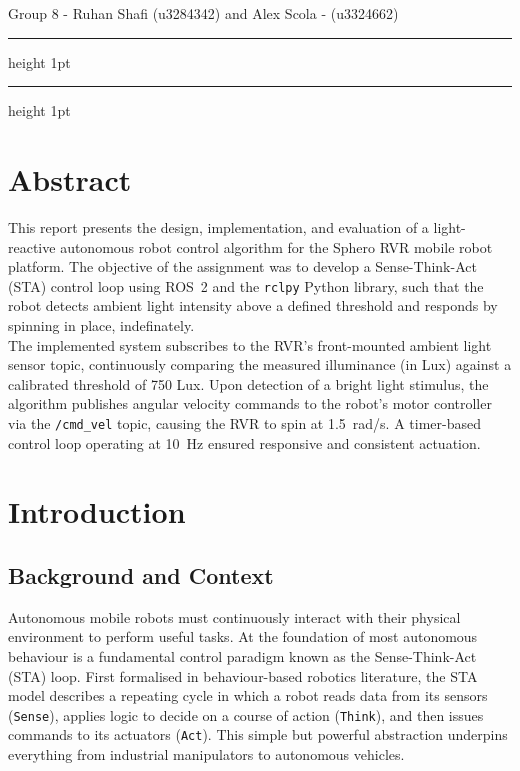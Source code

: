 \documentclass[11 pt , a 4 paper ]{article}
\theoremstyle{definition}
\begin{document}
	\vskip 7pt
	 Group 8 - Ruhan Shafi (u3284342) and Alex Scola - (u3324662)
	{\color{aqua}\hrule height 1pt}
	{\color{grey}\hrule height 1pt}
	
	\vskip 5pt


 

	\section{Abstract}
	
	This report presents the design, implementation, and evaluation of a light-reactive autonomous robot control algorithm for the Sphero RVR mobile robot platform. The objective of the assignment was to develop a Sense-Think-Act (STA) control loop using ROS~2 and the \texttt{rclpy} Python library, such that the robot detects ambient light intensity above a defined threshold and responds by spinning in place, indefinately.\\

	\noindent The implemented system subscribes to the RVR's front-mounted ambient light sensor topic, continuously comparing the measured illuminance (in Lux) against a calibrated threshold of 750 Lux. Upon detection of a bright light stimulus, the algorithm publishes angular velocity commands to the robot's motor controller via the \texttt{/cmd\_vel} topic, causing the RVR to spin at 1.5~rad/s. A timer-based control loop operating at 10~Hz ensured responsive and consistent actuation.
	
	

	\section{Introduction}
	
	\subsection{Background and Context}
	Autonomous mobile robots must continuously interact with their physical environment to perform useful tasks. At the foundation of most autonomous behaviour is a fundamental control paradigm known as the Sense-Think-Act (STA) loop. First formalised in behaviour-based robotics literature, the STA model describes a repeating cycle in which a robot reads data from its sensors (\texttt{Sense}), applies logic to decide on a course of action (\texttt{Think}), and then issues commands to its actuators (\texttt{Act}). This simple but powerful abstraction underpins everything from industrial manipulators to autonomous vehicles.\\
	
\end{document}

